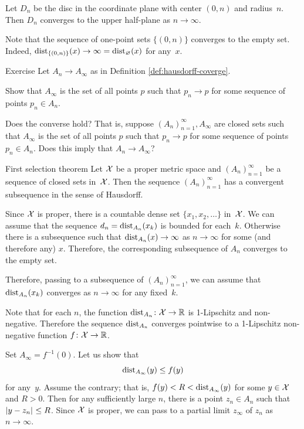 Let $D_n$ be the disc in the coordinate plane 
with center $(0,n)$ and radius~$n$.
Then $D_n$ converges to the upper half-plane as $n\to\infty$. 

Note that the sequence of one-point sets $\{(0,n)\}$ converges to the empty set.
Indeed, $\distfun_{\{(0,n)\}}(x)\to \infty=\distfun_\emptyset(x)$ for any~$x$.

\begin{thm}{Exercise}\label{ex:hausdorff-conv}
Let $A_n\to A_\infty$ as in Definition \ref{def:hausdorff-coverge}.  

Show that $A_\infty$ is the set of all points $p$ such that   $p_n\to p$ for some sequence of points  $p_n\in A_n$.

Does  the converse hold? That is, suppose $(A_n)_{n=1}^\infty, A_\infty$ are closed sets such that  $A_\infty$  is the set of all points $p$ such that   $p_n\to p$ for some sequence of points  $p_n\in A_n$.
Does this imply that $A_n\to A_\infty$?
\end{thm}

\begin{thm}{First selection theorem}
Let $\mathcal{X}$ be a proper metric space
and $(A_n)_{n=1}^\infty$ be a sequence of closed sets in~$\mathcal{X}$.
Then the sequence  $(A_n)_{n=1}^\infty$ has a convergent subsequence in the sense of Hausdorff.
\end{thm}

Since $\mathcal{X}$ is proper,
there is a countable dense set $\{x_1,x_2,\ldots\}$ in~$\mathcal{X}$.
We can assume that the sequence $d_n=\mathrm{dist}_{A_n}(x_k)$ is bounded for each~$k$.
Otherwise there is a subsequence such that $\distfun_{A_n}(x)\to \infty$ as $n\to \infty$ for some (and therefore any) $x$.
Therefore, the corresponding subsequence of $A_n$ converges to the empty set.

Therefore, passing to a subsequence of $(A_n)_{n=1}^\infty$,
we can assume that $\mathrm{dist}_{A_n}(x_k)$ converges as $n\to\infty$ for any fixed~$k$.

Note that for each $n$, the function $\distfun_{A_n}\:\spc{X}\to\RR$ is 1-Lipschitz and non-negative.
Therefore the sequence $\mathrm{dist}_{A_n}$ converges pointwise to a 1-Lipschitz non-negative function $f\:\spc{X}\to\RR$.

Set $A_\infty=f^{-1}(0)$. Let us show that 
\[\distfun_{A_\infty}(y)\le f(y)\] 
for any~$y$.
Assume the contrary;
that is, 
$f(y)<R<\mathrm{dist}_{A_\infty}(y)$
for some $y\in \spc{X}$ and $R>0$.
Then for any sufficiently large $n$, there is a point $z_n\in A_n$ such that
$\dist{y}{z_n}{}\le R$.
Since $\mathcal{X}$ is proper, we can pass to a partial limit $z_\infty$ of $z_n$ as $n\to\infty$.

